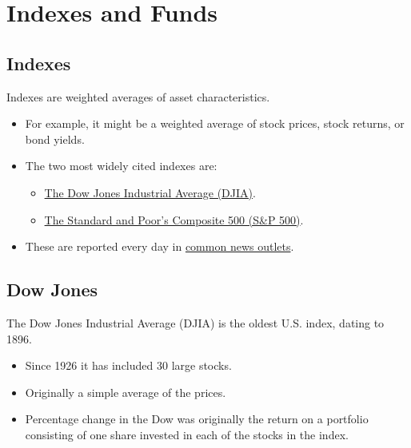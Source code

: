 \documentclass[letterpaper,10pt,english]{sphinxmanual}
\begin{document}
\section{Indexes and Funds}
\label{indexes:indexes-and-funds}\label{indexes::doc}

\subsection{Indexes}
\label{indexes:indexes}
Indexes are weighted averages of asset characteristics.
\begin{itemize}
\item {} 
For example, it might be a weighted average of stock prices, stock
returns, or bond yields.

\end{itemize}
\begin{itemize}
\item {} 
The two most widely cited indexes are:
\begin{itemize}
\item {} 
\href{http://en.wikipedia.org/wiki/Djia}{The Dow Jones Industrial Average (DJIA)}.

\end{itemize}
\begin{itemize}
\item {} 
\href{http://en.wikipedia.org/wiki/S\%26P\_500}{The Standard and Poor's Composite 500 (S\&P 500)}.

\end{itemize}

\end{itemize}
\begin{itemize}
\item {} 
These are reported every day in \href{http://wsj.com}{common news outlets}.

\end{itemize}


\subsection{Dow Jones}
\label{indexes:dow-jones}
The Dow Jones Industrial Average (DJIA) is the oldest U.S. index,
dating to 1896.
\begin{itemize}
\item {} 
Since 1926 it has included 30 large stocks.

\end{itemize}
\begin{itemize}
\item {} 
Originally a simple average of the prices.

\end{itemize}
\begin{itemize}
\item {} 
Percentage change in the Dow was originally the return on a
portfolio consisting of one share invested in each of the stocks
in the index.

\end{itemize}
\end{document}
